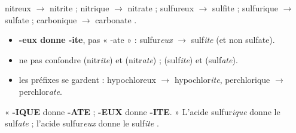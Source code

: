 \documentclass[11pt,a4paper]{article}
\begin{document}
\begin{exemplebox}
 nitreux $\to$ nitrite  ;  nitrique $\to$ nitrate  ;
 sulfureux $\to$ sulfite  ;  sulfurique $\to$ sulfate  ;
 carbonique $\to$ carbonate .
\end{exemplebox}

\begin{piege}
\begin{itemize}[leftmargin=1.4em,topsep=2pt,itemsep=1pt]
  \item \textbf{-eux donne -ite}, pas « -ate » : sulfur\emph{eux} $\to$ sulf\emph{ite} (et non sulfate).
  \item ne pas confondre  (nitr\emph{ite}) et  (nitr\emph{ate}) ;  (sulf\emph{ite})
        et  (sulf\emph{ate}).
  \item les préfixes se gardent : hypochloreux $\to$ hypochlor\emph{ite}, perchlorique $\to$ perchlor\emph{ate}.
\end{itemize}
\end{piege}

\begin{remarque}
« \textbf{-IQUE} donne \textbf{-ATE} ; \textbf{-EUX} donne \textbf{-ITE}. » L'acide sulfur\emph{ique}
 donne le sulf\emph{ate}  ; l'acide sulfur\emph{eux}  donne le sulf\emph{ite}
.
\end{remarque}
\end{document}
